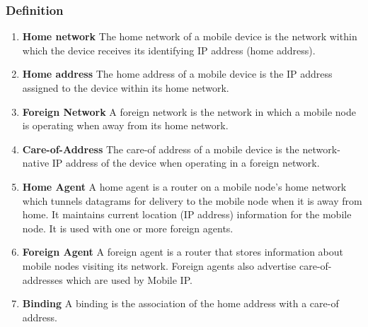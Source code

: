 \documentclass[11pt, a4paper]{article}
\begin{document}
\subsubsection{Definition}
\begin{enumerate}
    \item \textbf{Home network} The home network of a mobile device is the network within which the device receives its identifying IP address (home address).
    \item \textbf{Home address} The home address of a mobile device is the IP address assigned to the device within its home network.
    \item \textbf{Foreign Network} A foreign network is the network in which a mobile node is operating when away from its home network.
    \item \textbf{Care-of-Address} The care-of address of a mobile device is the network-native IP address of the device when operating in a foreign network.
    \item \textbf{Home Agent} A home agent is a router on a mobile node’s home network which tunnels datagrams for delivery to the mobile node when it is away from home. It maintains current location (IP address) information for the mobile node. It is used with one or more foreign agents.
    \item \textbf{Foreign Agent} A foreign agent is a router that stores information about mobile nodes visiting its network. Foreign agents also advertise care-of-addresses which are used by Mobile IP.
    \item \textbf{Binding} A binding is the association of the home address with a care-of address.
\end{enumerate}
\end{document}
